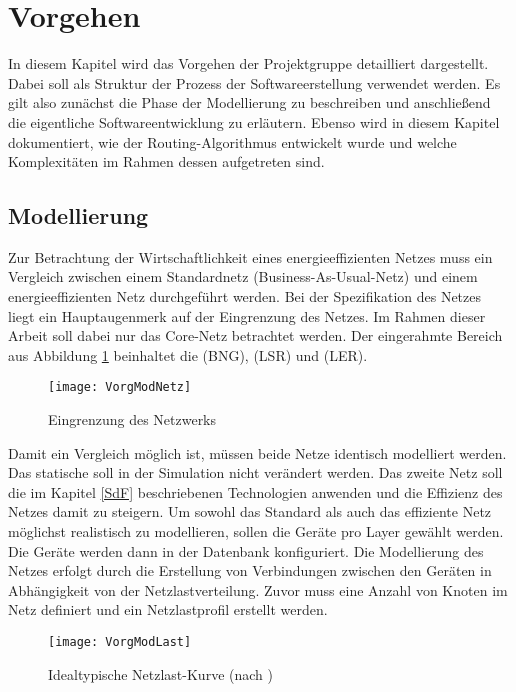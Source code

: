 \section{Vorgehen}
In diesem Kapitel wird das Vorgehen der Projektgruppe detailliert dargestellt. Dabei soll als Struktur der Prozess der Softwareerstellung verwendet werden. Es gilt also zunächst die Phase der Modellierung zu beschreiben und anschließend die eigentliche Softwareentwicklung zu erläutern. Ebenso wird in diesem Kapitel dokumentiert, wie der Routing-Algorithmus entwickelt wurde und welche Komplexitäten im Rahmen dessen aufgetreten sind.

\subsection{Modellierung}
Zur Betrachtung der Wirtschaftlichkeit eines energieeffizienten Netzes muss ein Vergleich zwischen einem Standardnetz (Business-As-Usual-Netz) und einem energieeffizienten Netz durchgeführt werden. Bei der Spezifikation des Netzes liegt ein Hauptaugenmerk auf der Eingrenzung des Netzes. Im Rahmen dieser Arbeit soll dabei nur das Core-Netz betrachtet werden. Der eingerahmte Bereich aus Abbildung \ref{fig:VorgModNetz} beinhaltet die  (BNG),  (LSR) und  (LER).


\begin{figure}[!ht]
	\centering
	\texttt{[image: VorgModNetz]}
	\caption{Eingrenzung des Netzwerks} 
	\label{fig:VorgModNetz}
\end{figure}


Damit ein Vergleich möglich ist, müssen beide Netze identisch modelliert werden. Das statische soll in der Simulation nicht  verändert werden. Das zweite Netz soll die im Kapitel \ref{SdF} beschriebenen Technologien anwenden und die Effizienz des Netzes damit zu steigern. Um sowohl das Standard als auch das effiziente Netz möglichst realistisch zu modellieren, sollen die Geräte pro Layer gewählt werden. Die Geräte werden dann in der Datenbank konfiguriert.  Die Modellierung des Netzes erfolgt durch die Erstellung von Verbindungen zwischen den Geräten in Abhängigkeit von der Netzlastverteilung. Zuvor muss eine Anzahl von Knoten im Netz definiert und ein Netzlastprofil erstellt werden.

\begin{figure}[!ht]
	\centering
	\texttt{[image: VorgModLast]}
	\caption{Idealtypische Netzlast-Kurve (nach \cite[3]{Chiaraviglio2009})} 
	\label{fig:VorgModLast}
\end{figure}


